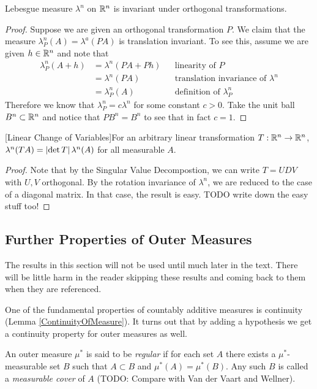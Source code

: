 \begin{cor}\label{LesbegueRotationInvariance} Lebesgue measure $\lambda^n$ on $\mathbb{R}^n$ is invariant
  under orthogonal transformations.
\end{cor}
\begin{proof}Suppose we are given an orthogonal transformation $P$.
  We claim that the measure $\lambda^n_P(A) = \lambda^a(P A)$ is
  translation invariant.   To see this, assume we are given $h \in
  \mathbb{R}^n$ and note that 
\begin{align*}
\lambda^n_P(A + h) &= \lambda^n(P A + Ph)  & &\text{linearity of $P$} \\
&= \lambda^n(PA) & &\text{translation invariance of $\lambda^n$} \\
&= \lambda^n_P(A) & &\text{definition of $\lambda^n_P$}
\end{align*}
Therefore we know that $\lambda^n_P = c \lambda^n$ for some constant
$c>0$.  Take the unit ball $B^n \subset \mathbb{R}^n$ and notice that $P
B^n = B^n$ to see that in fact $c = 1$.
\end{proof}
\begin{cor}\label{LebesgueLinearChangeOfVariables}[Linear Change of Variables]For an arbitrary linear transformation $T : \mathbb{R}^n \to
  \mathbb{R}^n$, $\lambda^n(T A) = \left \vert \det{T} \right \vert \lambda^n(A)$ for all
  measurable $A$.
\end{cor}
\begin{proof}Note that by the Singular Value Decompostion, we can
  write $T = U D V$ with $U,V$ orthogonal.  By the rotation invariance
  of $\lambda^n$, we are reduced to the case of a diagonal matrix.  In
  that case, the result is easy.
TODO write down the easy stuff too!
\end{proof}

\subsection{Further Properties of Outer Measures}

The results in this section will not be used until much later in the text.  There will be little harm in the reader skipping these results and coming back to them when they are referenced.

One of the fundamental properties of countably additive measures is continuity (Lemma \ref{ContinuityOfMeasure}).  It turns out that
by adding a hypothesis we get a continuity property for outer measures as well.

\begin{defn}An outer measure $\mu^*$ is said to be \emph{regular} if for each set $A$ there exists a $\mu^*$-measurable set $B$ such that
$A \subset B$ and $\mu^*(A) = \mu^*(B)$.  Any such $B$ is called a \emph{measurable cover} of $A$ (TODO: Compare with Van der Vaart and Wellner).
\end{defn}

